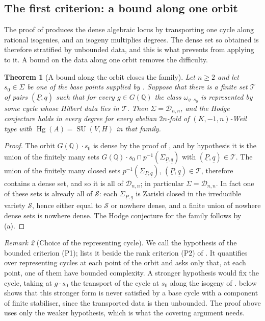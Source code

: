 \documentclass[11pt,reqno]{amsart}
\theoremstyle{plain}
\newtheorem{theorem}{Theorem}[section]
\theoremstyle{definition}
\theoremstyle{remark}
\newtheorem{remark}[theorem]{Remark}
\newcommand{\QQ}{\mathbb{Q}}
\newcommand{\cD}{\mathcal{D}}
\newcommand{\cS}{\mathcal{S}}
\DeclareMathOperator{\Hg}{Hg}
\DeclareMathOperator{\SU}{SU}
\begin{document}
\subsection{The first criterion: a bound along one orbit}

The proof of  produces the dense algebraic locus by
transporting one cycle along rational isogenies, and an isogeny multiplies
degrees. The dense set so obtained is therefore stratified by unbounded data,
and this is what prevents  from applying to it. A bound
on the data along one orbit removes the difficulty.

\begin{theorem}[A bound along the orbit closes the family]\label{thm:degreebound}
Let $n\ge2$ and let $s_{0}\in\Sigma$ be one of the base points supplied by
. Suppose that there is a finite set $\mathcal{T}$ of pairs
$(\underline{P},\underline{q})$ such that for every $g\in G(\QQ)$ the class
$\omega_{g\cdot s_{0}}$ is represented by some cycle whose Hilbert data lies
in $\mathcal{T}$. Then $\Sigma=\cD_{n,n}$, and the Hodge conjecture holds in every
degree for every abelian $2n$-fold of $(K,-1,n)$-Weil type with
$\Hg(A)=\SU(V,H)$ in that family.
\end{theorem}

\begin{proof}
The orbit $G(\QQ)\cdot s_{0}$ is dense by the proof of ,
and by hypothesis it is the union of the finitely many sets
$G(\QQ)\cdot s_{0}\cap p^{-1}(\Sigma_{\underline{P},\underline{q}})$ with
$(\underline{P},\underline{q})\in\mathcal{T}$. The union of the finitely
many closed sets $p^{-1}(\Sigma_{\underline{P},\underline{q}})$,
$(\underline{P},\underline{q})\in\mathcal{T}$, therefore contains a dense set,
and so it is all of $\cD_{n,n}$; in particular $\Sigma=\cD_{n,n}$. In fact one
of these sets is already all of $\cS$: each
$\Sigma_{\underline{P},\underline{q}}$ is Zariski closed in the irreducible
variety $\cS$, hence either equal to $\cS$ or nowhere dense, and a finite
union of nowhere dense sets is nowhere dense. The Hodge conjecture for the
family follows by (a).
\end{proof}

\begin{remark}[Choice of the representing cycle]\label{rem:chosencycle}
We call the hypothesis of  the bounded criterion
\textup{(P1)}; \cite[Remark~3.7]{paperII} lists it beside the rank criterion
\textup{(P2)} of \cite[Theorem~2.3]{paperII}. It quantifies over representing
cycles at each point of the orbit and asks only that, at each point, one of
them have bounded complexity. A stronger hypothesis would fix the cycle,
taking at $g\cdot s_{0}$ the transport of the cycle at $s_{0}$ along the
isogeny of .  below shows that this
stronger form is never satisfied by a base cycle with a component of finite
stabiliser, since the transported data is then unbounded. The proof above
uses only the weaker hypothesis, which is what the covering argument needs.
\end{remark}
\end{document}
